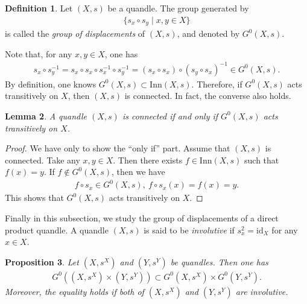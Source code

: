 \documentclass[12pt]{amsart}
\newtheorem{Prop}{Proposition}[section]
\newtheorem{Lem}[Prop]{Lemma}
\theoremstyle{definition}
\newtheorem{Def}[Prop]{Definition}
\begin{document}
\begin{Def}\label{Def4.1}
Let $ (X,s) $ be a quandle. The group generated by
\begin{align*}
\{ s_{x} \circ s_{y} \mid x,y \in X \}
\end{align*}
is called the \textit{group of displacements} of $ (X,s) $, and denoted by $ G^{0}(X,s) $.
\end{Def}

Note that, for any $ x,y \in X $, one has
\begin{align*}
s_{x} \circ s^{-1}_{y} = s_{x} \circ s_{x} \circ s^{-1}_{x} \circ s^{-1}_{y} = (s_{x} \circ s_{x}) \circ (s_{y} \circ s_{x})^{-1} \in G^{0}(X,s).
\end{align*}
By definition, one knows $ G^{0}(X,s) \subset {\mathrm{Inn}}(X,s) $. Therefore, if $ G^{0}(X,s) $ acts transitively on $ X $, then $ (X,s) $ is connected. In fact, the converse also holds.

\begin{Lem}\label{Lem4.2}
A quandle $ (X,s) $ is connected if and only if $ G^{0}(X,s) $ acts transitively on $ X $.
\end{Lem}

\begin{proof}
We have only to show the ``only if'' part. Assume that $ (X,s) $ is connected. Take any $ x,y \in X $. Then there exists $ f \in {\mathrm{Inn}}(X,s) $ such that $ f(x) = y $. If $ f \notin G^{0}(X,s) $, then we have
\begin{align*}
f \circ s_{x} \in G^{0}(X,s),\ f \circ s_{x} (x) = f (x) = y.
\end{align*}
This shows that $ G^{0}(X,s) $ acts transitively on $ X $.
\end{proof}

Finally in this subsection, we study the group of displacements of a direct product quandle. A quandle $ (X,s) $ is said to be \textit{involutive} if $ s_{x}^{2} = {\mathrm{id}}_{X} $ for any $ x \in X $.

\begin{Prop}\label{Prop4.3}
Let $ (X,s^{X}) $ and $ (Y,s^{Y}) $ be quandles. Then one has
\begin{align*}
G^{0}((X,s^{X}) \times (Y,s^{Y})) \subset G^{0}(X,s^{X}) \times G^{0}(Y,s^{Y}).
\end{align*}
Moreover, the equality holds if both of $ (X,s^{X}) $ and $ (Y,s^{Y}) $ are involutive.
\end{Prop}
\end{document}
